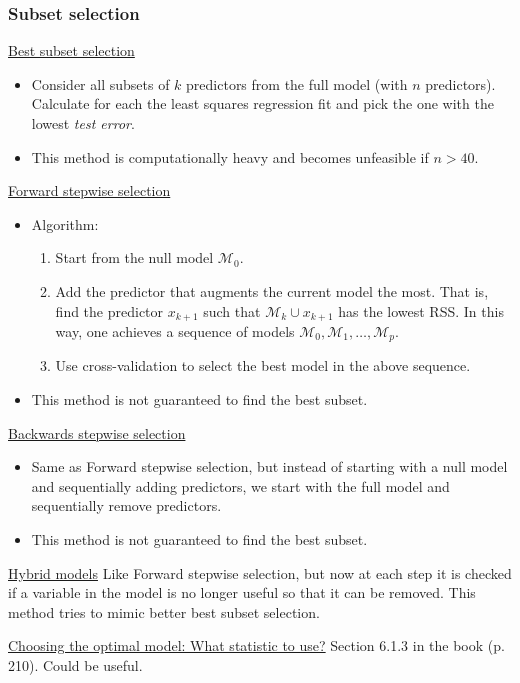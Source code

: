 \subsubsection*{Subset selection}
\underline{Best subset selection}
\begin{itemize}
    \item Consider all subsets of $k$ predictors from the full model (with $n$ predictors). Calculate for each the least squares regression fit and pick the one with the lowest \textit{test error}.
    \item This method is computationally heavy and becomes unfeasible if $n > 40$.
\end{itemize}

\underline{Forward stepwise selection}
\begin{itemize}
    \item Algorithm: 
        \begin{enumerate}
        \item Start from the null model $\mathcal{M}_0$.
        \item Add the predictor that augments the current model the most. That is, find the predictor $x_{k+1}$ such that $\mathcal{M}_{k} \cup x_{k+1}$ has the lowest RSS. In this way, one achieves a sequence of models $\mathcal{M}_0, \mathcal{M}_1, \dots, \mathcal{M}_p$.
        \item Use cross-validation to select the best model in the above sequence. 
        \end{enumerate}
    \item This method is not guaranteed to find the best subset. 
\end{itemize}

\underline{Backwards stepwise selection}
\begin{itemize}
    \item Same as Forward stepwise selection, but instead of starting with a null model and sequentially adding predictors, we start with the full model and sequentially remove predictors.
    \item This method is not guaranteed to find the best subset.
\end{itemize}

\underline{Hybrid models}
Like Forward stepwise selection, but now at each step it is checked if a variable in the model is no longer useful so that it can be removed. This method tries to mimic better best subset selection.

\underline{Choosing the optimal model: What statistic to use?}
Section 6.1.3 in the book (p. 210). Could be useful.

